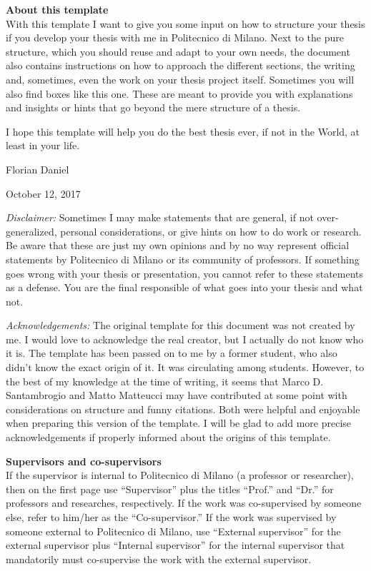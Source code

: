 \documentclass[11pt,a4paper,twoside,openright]{report}
\newcommand{\note}[2]{\begin{framed}\sffamily\small
\noindent \textbf{#1} \\ #2\end{framed}}
\begin{document}


\thispagestyle{empty} \normalfont 

\clearpage
\note{About this template}{With this template I want to give you some input on how to structure your thesis if you develop your thesis with me in Politecnico di Milano. Next to the pure structure, which you should reuse and adapt to your own needs, the document also contains instructions on how to approach the different sections, the writing and, sometimes, even the work on your thesis project itself. Sometimes you will also find boxes like this one. These are meant to provide you with explanations and insights or hints that go beyond the mere structure of a thesis. 

I hope this template will help you do the best thesis ever, if not in the World, at least in your life.

\hfill Florian Daniel

\hfill October 12, 2017

\bigskip \noindent \emph{Disclaimer:} Sometimes I may make statements that are general, if not over-generalized, personal considerations, or give hints on how to do work or research. Be aware that these are just my own opinions and by no way represent official statements by Politecnico di Milano or its community of professors. If something goes wrong with your thesis or presentation, you cannot refer to these statements as a defense. You are the final responsible of what goes into your thesis and what not.

\medskip \noindent \emph{Acknowledgements:} The original template for this document was not created by me. I would love to acknowledge the real creator, but I actually do not know who it is. The template has been passed on to me by a former student, who also didn't know the exact origin of it. It was circulating among students. However, to the best of my knowledge at the time of writing, it seems that Marco D. Santambrogio and Matto Matteucci may have contributed at some point with considerations on structure and funny citations. Both were helpful and enjoyable when preparing this version of the template. I will be glad to add more precise acknowledgements if properly informed about the origins of this template.} 

\note{Supervisors and co-supervisors}{If the supervisor is internal to Politecnico di Milano (a professor or researcher), then on the first page use ``Supervisor'' plus the titles ``Prof.'' and ``Dr.'' for professors and researches, respectively. If the work was co-supervised by someone else, refer to him/her as the ``Co-supervisor.'' If the work was supervised by someone external to Politecnico di Milano, use ``External supervisor'' for the external supervisor plus ``Internal supervisor'' for the internal supervisor that mandatorily must co-supervise the work with the external supervisor. }
\clearpage
\end{document}
